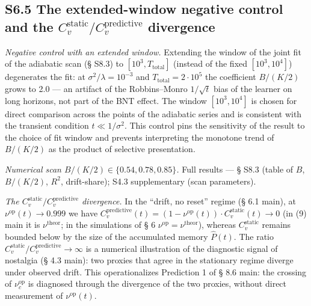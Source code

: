 \documentclass[pdflatex,sn-mathphys-ay]{sn-jnl}
\begin{document}
\subsection*{\texorpdfstring{S6.5 The extended-window negative control and the \(C_v^{\text{static}}/C_v^{\text{predictive}}\) divergence}{S6.5 The extended-window negative control and the C\_v\^{}\{\textbackslash text\{static\}\}/C\_v\^{}\{\textbackslash text\{predictive\}\} divergence}}\label{s6.5-the-extended-window-negative-control-and-the-c_vtextstaticc_vtextpredictive-divergence}



\emph{Negative control with an extended window.} Extending the window of the joint fit of the adiabatic scan (§ S8.3) to \([10^3, T_{\text{total}}]\) (instead of the fixed \([10^3, 10^4]\)) degenerates the fit: at \(\sigma^2/\lambda = 10^{-3}\) and \(T_{\text{total}} = 2\cdot 10^5\) the coefficient \(B/(K/2)\) grows to 2.0 --- an artifact of the Robbins--Monro \(1/\sqrt t\) bias of the learner on long horizons, not part of the BNT effect. The window \([10^3, 10^4]\) is chosen for direct comparison across the points of the adiabatic series and is consistent with the transient condition \(t \ll 1/\sigma^2\). This control pins the sensitivity of the result to the choice of fit window and prevents interpreting the monotone trend of \(B/(K/2)\) as the product of selective presentation.



\emph{Numerical scan \(B/(K/2) \in \{0.54, 0.78, 0.85\}\).} Full results --- § S8.3 (table of \(B\), \(B/(K/2)\), \(R^2\), drift-share); S4.3 supplementary (scan parameters).



\emph{The \(C_v^{\text{static}}/C_v^{\text{predictive}}\) divergence.} In the ``drift, no reset'' regime (§ 6.1 main), at \(\nu^{\text{op}}(t) \to 0.999\) we have \(C_v^{\text{predictive}}(t) = (1 - \nu^{\text{op}}(t)) \cdot C_v^{\text{static}}(t) \to 0\) (in (9) main it is \(\nu^{\text{theor}}\); in the simulations of § 6 \(\nu^{\text{op}} = \nu^{\text{theor}}\)), whereas \(C_v^{\text{static}}\) remains bounded below by the size of the accumulated memory \(\hat P(t)\). The ratio \(C_v^{\text{static}}/C_v^{\text{predictive}} \to \infty\) is a numerical illustration of the diagnostic signal of nostalgia (§ 4.3 main): two proxies that agree in the stationary regime diverge under observed drift. This operationalizes Prediction 1 of § 8.6 main: the crossing of \(\nu_c^{\text{op}}\) is diagnosed through the divergence of the two proxies, without direct measurement of \(\nu^{\text{op}}(t)\).
\end{document}
